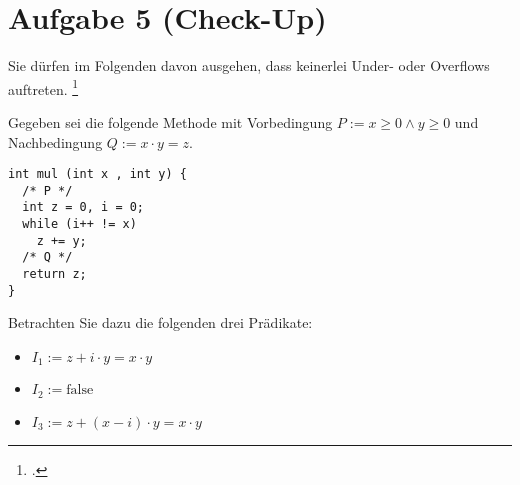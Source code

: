 \documentclass{lehramt-informatik-aufgabe}
\begin{document}

\section{Aufgabe 5 (Check-Up)
}

Sie dürfen im Folgenden davon ausgehen, dass keinerlei Under- oder
Overflows auftreten.
\footcite[Thema 2 Teilaufgabe 2 Aufgabe 4]{examen:66116:2017:03}

Gegeben sei die folgende Methode mit Vorbedingung $P := x \geq 0 \land y
\geq 0$ und Nachbedingung $Q := x \cdot y = z$.

\begin{verbatim}
int mul (int x , int y) {
  /* P */
  int z = 0, i = 0;
  while (i++ != x)
    z += y;
  /* Q */
  return z;
}
\end{verbatim}

Betrachten Sie dazu die folgenden drei Prädikate:

\begin{itemize}
\item $I_1 := z + i \cdot y = x \cdot y$
\item $I_2 := \text{false}$
\item $I_3 := z + (x - i) \cdot y = x \cdot y$
\end{itemize}
\end{document}
